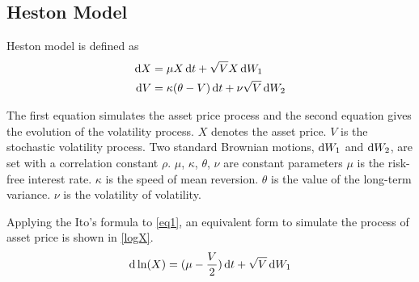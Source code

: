 \documentclass{ws-ijfe}
\begin{document}
\subsection{Heston Model}
Heston model is defined as
 \begin{align}
    \d X & =\mu X\,\d t+\sqrt{V}X\,\d W_1\label{eq1}\\
    \d V &= \kappa (\theta-V)\,\d t +\nu\sqrt{V}\,\d W_2\label{eq2}
  \end{align}

 The first equation simulates the asset price process and the second equation gives the evolution of the volatility process. $X$ denotes the asset price. $V$ is the stochastic volatility process.  Two standard Brownian motions, $\mathrm{d} W_1$ and $\mathrm{d} W_2$, are set with a correlation constant $\rho$. $\mu$, $\kappa$, $\theta$, $\nu$ are constant parameters $\mu$ is the risk-free interest rate. $\kappa$ is the speed of mean reversion. $\theta$ is the value of the long-term variance. $\nu$ is the volatility of volatility.


Applying the Ito's formula to \eqref{eq1}, an equivalent form to simulate the process of asset price is shown in \eqref{logX}.
\begin{equation}\label{logX}
  \d\ln(X)=(\mu-\frac{V}{2})\,\d t+\sqrt{V}\,\d W_1
\end{equation}
\end{document}
